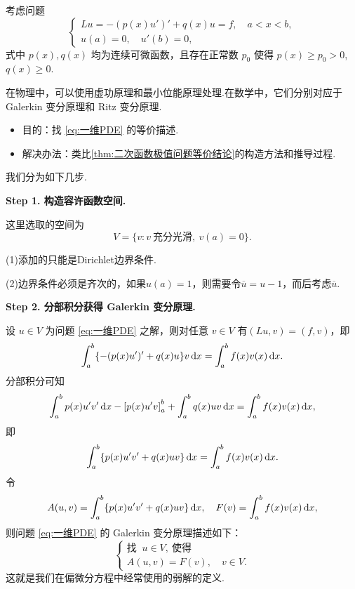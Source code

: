 考虑问题
\begin{equation}\label{eq:一维PDE}
    \begin{cases}
        Lu = -(p(x)u')' + q(x)u = f, \quad a < x < b, \\
        u(a) = 0, \quad u'(b) = 0,
    \end{cases}
\end{equation}
式中 $p(x), q(x)$ 均为连续可微函数，且存在正常数 $p_0$ 使得 $p(x) \geq p_0 > 0$, $q(x) \geq 0$.\par
在物理中，可以使用虚功原理和最小位能原理处理.在数学中，它们分别对应于 Galerkin 变分原理和 Ritz 变分原理.

\begin{note}[目的与解决办法]
\begin{itemize}
    \item 目的：找 \eqref{eq:一维PDE} 的等价描述.
    \item 解决办法：类比\cref{thm:二次函数极值问题等价结论}的构造方法和推导过程.
\end{itemize}
\end{note}

我们分为如下几步.

\noindent\textbf{Step 1. 构造容许函数空间.} 

这里选取的空间为
\begin{equation*}
    V = \{v : v\ \text{充分光滑},\ v(a) = 0\}.
\end{equation*}
\begin{remark}
    (1)添加的只能是Dirichlet边界条件.\par
    (2)边界条件必须是齐次的，如果$u(a)=1$，则需要令$\overline{u}=u-1$，而后考虑$\overline{u}$.
\end{remark}

\noindent\textbf{Step 2. 分部积分获得 Galerkin 变分原理.} 

设 $u \in V$ 为问题 \eqref{eq:一维PDE} 之解，则对任意 $v \in V$ 有$(Lu, v) = (f, v)$，即
\begin{equation*}
    \int_a^b \{-(p(x)u')' + q(x)u\}v \mathop{}\!\mathrm{d} x = \int_a^b f(x)v(x) \mathop{}\!\mathrm{d} x.
\end{equation*}
分部积分可知
\begin{equation*}
    \int_a^b p(x)u'v' \mathop{}\!\mathrm{d} x - \left[p(x)u'v\right]_a^b + \int_a^b q(x)uv \mathop{}\!\mathrm{d} x = \int_a^b f(x)v(x) \mathop{}\!\mathrm{d} x,
\end{equation*}
即
\begin{equation*}
    \int_a^b \{p(x)u'v' + q(x)uv\} \mathop{}\!\mathrm{d} x = \int_a^b f(x)v(x) \mathop{}\!\mathrm{d} x.
\end{equation*}
令
\begin{equation*}
    A(u, v) = \int_a^b \{p(x)u'v' + q(x)uv\} \mathop{}\!\mathrm{d} x, \quad F(v) = \int_a^b f(x)v(x) \mathop{}\!\mathrm{d} x,
\end{equation*}
则问题 \eqref{eq:一维PDE} 的 Galerkin 变分原理描述如下：
\begin{equation}\label{eq:Galerkin变分原理}
    \begin{cases}
        \text{找 }\ u \in V,\ \text{使得} \\
        A(u, v) = F(v), \quad v \in V.
    \end{cases}
\end{equation}
这就是我们在偏微分方程中经常使用的弱解的定义.

